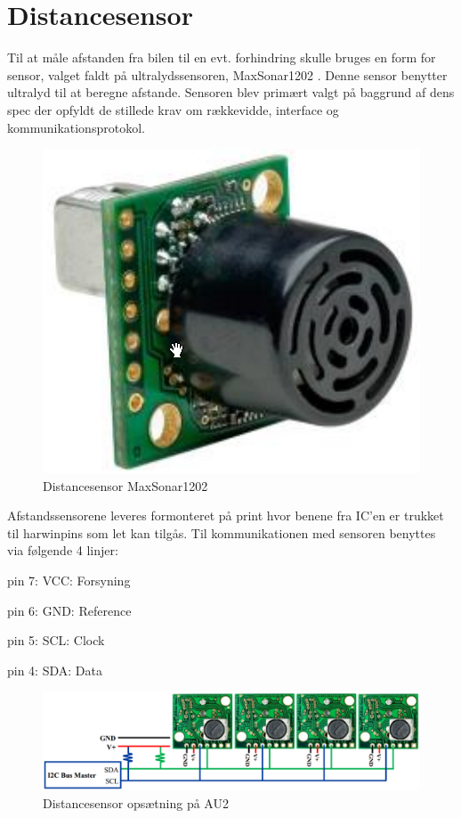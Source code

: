 \section{Distancesensor} \label{sec:hw_design_distancesensor}

Til at måle afstanden fra bilen til en evt. forhindring skulle bruges en form for sensor, valget faldt på ultralydssensoren, MaxSonar1202 \cite{lib:maxsonar}. 
Denne sensor benytter ultralyd til at beregne afstande.
Sensoren blev primært valgt på baggrund af dens spec der opfyldt de stillede krav om rækkevidde, interface og kommunikationsprotokol. 

\begin{figure}[ht]
	\centering
	\includegraphics[scale=0.4]{../fig/billeder/distancesensor.png}
	\caption{Distancesensor MaxSonar1202}
	\label{fig:ds_pic}
\end{figure}

Afstandssensorene leveres formonteret på print hvor benene fra IC'en er trukket til harwinpins som let kan tilgås. Til kommunikationen med sensoren benyttes \IIC via følgende 4 linjer:

\begin{packed_item}
	\item pin 7: VCC: Forsyning
	\item pin 6: GND: Reference
	\item pin 5: SCL: Clock
	\item pin 4: SDA: Data
\end{packed_item}

\begin{figure}[ht]
	\centering
	\includegraphics[width=\textwidth]{../fig/billeder/distancesensor_multi.png}
	\caption{Distancesensor opsætning på AU2}
	\label{fig:ds_multi}
\end{figure}

